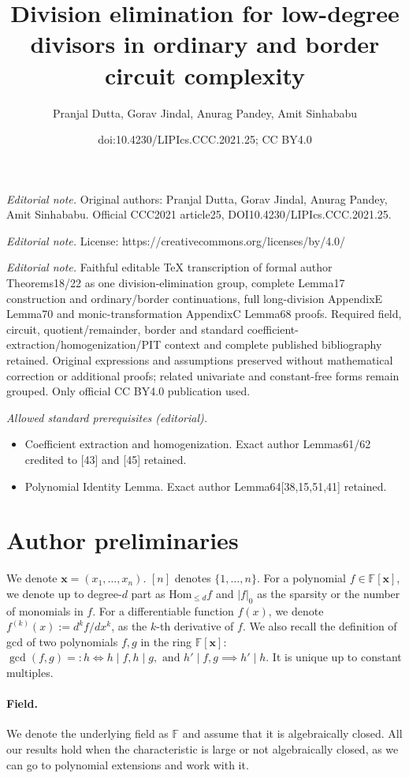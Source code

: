 \documentclass[10pt,a4paper]{article}
\title{Division elimination for low-degree divisors in ordinary and border circuit complexity}
\author{Pranjal Dutta, Gorav Jindal, Anurag Pandey, Amit Sinhababu}
\date{doi:10.4230/LIPIcs.CCC.2021.25; CC BY4.0}
\begin{document}
\maketitle
\noindent\textit{Editorial note.} Original authors: Pranjal Dutta, Gorav Jindal, Anurag Pandey, Amit Sinhababu. Official CCC2021 article25, DOI10.4230/LIPIcs.CCC.2021.25.\par\medskip
\noindent\textit{Editorial note.} License: https://creativecommons.org/licenses/by/4.0/\par\medskip
\noindent\textit{Editorial note.} Faithful editable TeX transcription of formal author Theorems18/22 as one division-elimination group, complete Lemma17 construction and ordinary/border continuations, full long-division AppendixE Lemma70 and monic-transformation AppendixC Lemma68 proofs. Required field, circuit, quotient/remainder, border and standard coefficient-extraction/homogenization/PIT context and complete published bibliography retained. Original expressions and assumptions preserved without mathematical correction or additional proofs; related univariate and constant-free forms remain grouped. Only official CC BY4.0 publication used.\par\medskip
\noindent\textit{Allowed standard prerequisites (editorial).}\begin{itemize}
\item Coefficient extraction and homogenization. Exact author Lemmas61/62 credited to [43] and [45] retained.
\item Polynomial Identity Lemma. Exact author Lemma64[38,15,51,41] retained.
\end{itemize}\medskip
\section*{Author preliminaries}
We denote $\mathbf x=(x_1,\ldots,x_n)$. $[n]$ denotes $\{1,\ldots,n\}$. For a polynomial $f\in\mathbb F[\mathbf x]$, we denote up to degree-$d$ part as $\mathrm{Hom}_{\le d}f$ and $|f|_0$ as the sparsity or the number of monomials in $f$. For a differentiable function $f(x)$, we denote $f^{(k)}(x):=d^kf/dx^k$, as the $k$-th derivative of $f$. We also recall the definition of gcd of two polynomials $f,g$ in the ring $\mathbb F[\mathbf x]$: $\gcd(f,g)=:h\iff h\mid f,h\mid g,\text{ and }h'\mid f,g\implies h'\mid h$. It is unique up to constant multiples.
\paragraph{Field.} We denote the underlying field as $\mathbb F$ and assume that it is algebraically closed. All our results hold when the characteristic is large or not algebraically closed, as we can go to polynomial extensions and work with it.
\end{document}
